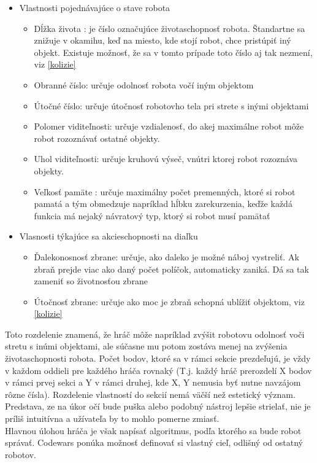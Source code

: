 \begin{itemize}
\item Vlastnosti pojednávajúce o stave robota
\begin{itemize} 
\item Dĺžka života : je číslo označujúce životaschopnosť robota. Štandartne sa znižuje v okamihu, keď na miesto, kde stojí robot, chce pristúpiť iný objekt. Existuje možnosť, že sa v tomto prípade toto číslo aj tak nezmení, viz \ref{kolizie} 
\item Obranné číslo: určuje odolnosť robota vočí iným objektom
\item Útočné číslo: určuje útočnosť robotovho tela pri strete s inými objektami
\item Polomer viditeľnosti: určuje vzdialenosť, do akej maximálne robot môže robot rozoznávať ostatné objekty.
\item Uhol viditeľnosti: určuje kruhovú výseč, vnútri ktorej robot rozoznáva objekty.
\item Veľkosť pamäte : určuje maximálny počet premenných, ktoré si robot pamatá a tým obmedzuje napríklad hĺbku zarekurzenia, keďže každá funkcia má nejaký návratový typ, ktorý si robot musí pamätať
\end{itemize}
\item Vlasnosti týkajúce sa akcieschopnosti na diaľku
\begin{itemize}
\item Ďalekonosnosť zbrane: určuje, ako daleko je možné náboj vystreliť. Ak zbraň prejde viac ako daný počet políčok, automaticky zaniká. Dá sa tak zameniť so životnosťou zbrane
\item Útočnosť zbrane: určuje ako moc je zbraň schopná ublížiť objektom, viz \ref{kolizie}
\end{itemize}
\end{itemize}
Toto rozdelenie znamená, že hráč môže napríklad zvýšit robotovu odolnosť voči stretu s inúmi objektami, ale súčasne mu potom zostáva menej na zvýšenia životaschopnosti robota. Počet bodov, ktoré sa v rámci sekcie prezdeľujú, je vždy v každom oddieli pre každého hráča rovnaký (T.j. každý hráč prerozdelí X bodov v rámci prvej sekci a  Y v rámci druhej, kde X, Y nemusia byť nutne navzájom rôzne čísla). Rozdelenie vlastností do sekcií nemá väčší než estetický význam. Predstava, ze na úkor očí bude puška alebo podobný nástroj lepšie strielať, nie je príliš intuitívna a užívateľa by to mohlo pomerne zmiasť.
\\Hlavnou úlohou hráča je však napísať algoritmus, podľa ktorého sa bude robot správať. Codewars ponúka možnosť definovať si vlastný cieľ, odlišný od ostatný robotov.\\
